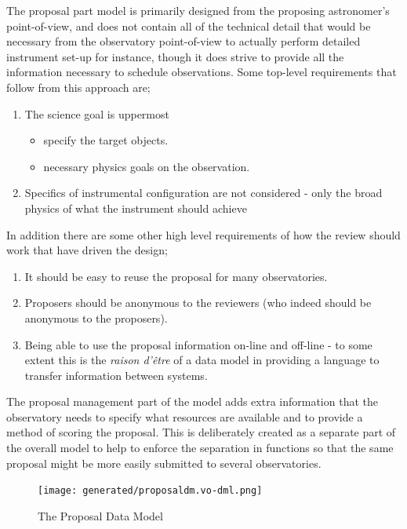\documentclass[10pt,a4paper]{ivoa}
\begin{document}
The proposal part model is primarily designed from the proposing astronomer's point-of-view, and does not contain all of the technical detail
that would be necessary from the observatory point-of-view to actually perform detailed instrument set-up for instance, though it does
strive to provide all the information necessary to schedule observations. Some top-level requirements that follow from this approach are;

\begin{enumerate}
    \item The science goal is uppermost
    \begin{itemize}
        \item specify the target objects.
        \item necessary physics goals on the observation.
    \end{itemize}
    \item Specifics of instrumental configuration are not considered - only the broad physics of what the instrument should achieve
\end{enumerate}

In addition there are some other high level requirements of how the review should work that have driven the design;

\begin{enumerate}
    \item It should be easy to reuse the proposal for many observatories.
    \item Proposers should be anonymous to the reviewers (who indeed should be anonymous to the proposers).
    \item Being able to use the proposal information on-line and off-line - to some extent this is the \textit{raison d'\^{e}tre} of a data model
          in providing a language to transfer information between systems.
\end{enumerate}


The proposal management part of the model adds extra information that the observatory needs to specify what resources are available
and to provide a method of scoring the proposal. This is deliberately created as a separate part of the overall model to help
to enforce the separation in functions so that the same proposal might be more easily submitted to several observatories.





\begin{figure}
    \centering
\texttt{[image: generated/proposaldm.vo-dml.png]}
\caption{The Proposal Data Model}
\label{fig:propdm}
\end{figure}
\end{document}
